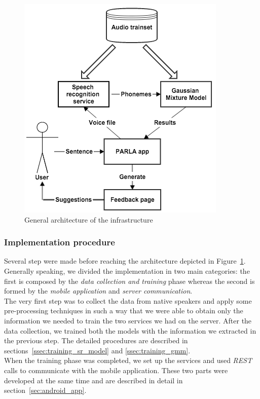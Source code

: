 \begin{figure}[!ht]
	\centering
	\includegraphics[scale=0.6]{Figures/general_architecture.png}
	\caption{General architecture of the infrastructure}
	\label{fig:general_architecture}
\end{figure}

\subsubsection{Implementation procedure}
\label{ssec:procedure}

Several step were made before reaching the architecture depicted in Figure~\ref{fig:general_architecture}. Generally speaking, we divided the implementation in two main categories: the first is composed by the \textit{data collection and training} phase whereas the second is formed by the \textit{mobile application} and \textit{server communication}. \\

\noindent The very first step was to collect the data from native speakers and apply some pre-processing techniques in such a way that we were able to obtain only the information we needed to train the two services we had on the server. After the data collection, we trained both the models with the information we extracted in the previous step. The detailed procedures are described in sections~\ref{ssec:training_sr_model} and \ref{ssec:training_gmm}. \\
\noindent When the training phase was completed, we set up the services and used \textit{REST} calls to communicate with the mobile application. These two parts were developed at the same time and are described in detail in section~\ref{sec:android_app}.


